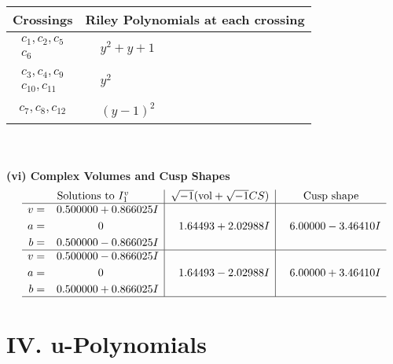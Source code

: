 \documentclass[1p]{elsarticle_modified}
\theoremstyle{definition}
\newcommand{\I}{\sqrt{-1}}
\begin{document}
\begin{tabular}{m{50pt}|m{274pt}}
Crossings & \hspace{64pt}Riley Polynomials at each crossing \\
\hline $$\begin{aligned}c_{1},c_{2},c_{5}\\c_{6}\end{aligned}$$&$\begin{aligned}
&y^2+y+1
\end{aligned}$\\
\hline $$\begin{aligned}c_{3},c_{4},c_{9}\\c_{10},c_{11}\end{aligned}$$&$\begin{aligned}
&y^2
\end{aligned}$\\
\hline $$\begin{aligned}c_{7},c_{8},c_{12}\end{aligned}$$&$\begin{aligned}
&(y-1)^2
\end{aligned}$\\
\hline
\end{tabular}\\~\\
\newpage\flushleft \textbf{(vi) Complex Volumes and Cusp Shapes}
$$\begin{array}{c|c|c}  
\text{Solutions to }I^v_{1}& \I (\text{vol} + \sqrt{-1}CS) & \text{Cusp shape}\\
 \hline 
\begin{aligned}
v &= \phantom{-}0.500000 + 0.866025 I \\
a &= \phantom{-0.000000 } 0 \\
b &= \phantom{-}0.500000 - 0.866025 I\end{aligned}
 & \phantom{-}1.64493 + 2.02988 I & \phantom{-}6.00000 - 3.46410 I \\ \hline\begin{aligned}
v &= \phantom{-}0.500000 - 0.866025 I \\
a &= \phantom{-0.000000 } 0 \\
b &= \phantom{-}0.500000 + 0.866025 I\end{aligned}
 & \phantom{-}1.64493 - 2.02988 I & \phantom{-}6.00000 + 3.46410 I\\
 \hline 
 \end{array}$$\newpage
\newpage\renewcommand{\arraystretch}{1}
\centering \section*{ IV. u-Polynomials}
\end{document}
